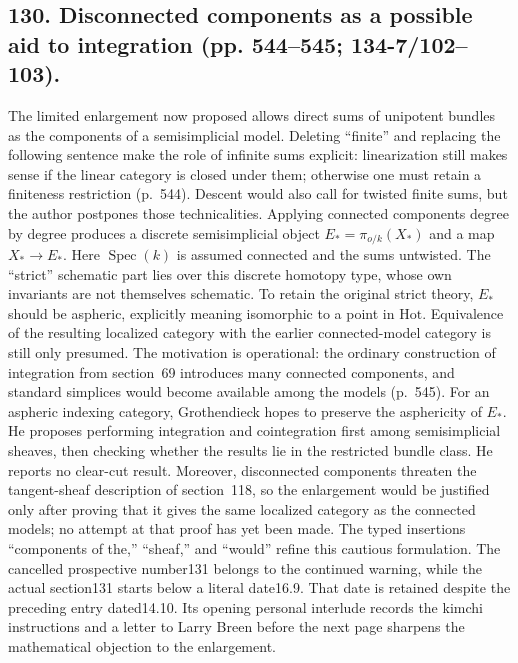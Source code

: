 \documentclass[10pt,oneside]{book}
\begin{document}
\subsection*{130. Disconnected components as a possible aid to integration (pp. 544--545; 134-7/102--103).}
The limited enlargement now proposed allows direct sums of unipotent bundles as the components of a semisimplicial model. Deleting ``finite'' and replacing the following sentence make the role of infinite sums explicit: linearization still makes sense if the linear category is closed under them; otherwise one must retain a finiteness restriction (p.~544). Descent would also call for twisted finite sums, but the author postpones those technicalities. Applying connected components degree by degree produces a discrete semisimplicial object $E_* = \pi_{o/k}(X_*)$ and a map $X_*\to E_*$. Here $\operatorname{Spec}(k)$ is assumed connected and the sums untwisted. The ``strict'' schematic part lies over this discrete homotopy type, whose own invariants are not themselves schematic. To retain the original strict theory, $E_*$ should be aspheric, explicitly meaning isomorphic to a point in $\mathrm{Hot}$. Equivalence of the resulting localized category with the earlier connected-model category is still only presumed. The motivation is operational: the ordinary construction of integration from section~69 introduces many connected components, and standard simplices would become available among the models (p.~545). For an aspheric indexing category, Grothendieck hopes to preserve the asphericity of $E_*$. He proposes performing integration and cointegration first among semisimplicial sheaves, then checking whether the results lie in the restricted bundle class. He reports no clear-cut result. Moreover, disconnected components threaten the tangent-sheaf description of section~118, so the enlargement would be justified only after proving that it gives the same localized category as the connected models; no attempt at that proof has yet been made. The typed insertions ``components of the,'' ``sheaf,'' and ``would'' refine this cautious formulation. The cancelled prospective number131 belongs to the continued warning, while the actual section131 starts below a literal date16.9. That date is retained despite the preceding entry dated14.10. Its opening personal interlude records the kimchi instructions and a letter to Larry Breen before the next page sharpens the mathematical objection to the enlargement.
\end{document}

